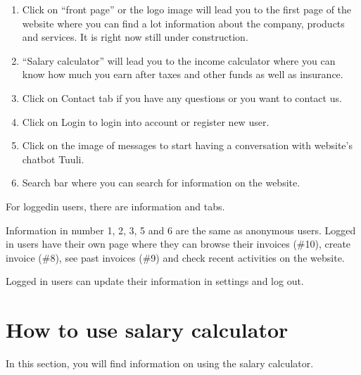 \documentclass[letterpaper,10pt,english]{sphinxmanual}
\begin{document}
\noindent{}
\begin{enumerate}
%
\item {} 
\sphinxAtStartPar
Click on “front page” or the logo image  will lead you to the first page of the website where you can find a lot information about the company, products and services. It is right now still under construction.

\item {} 
\sphinxAtStartPar
“Salary calculator” will lead you to the income calculator where you can know how much you earn after taxes and other funds as well as insurance.

\item {} 
\sphinxAtStartPar
Click on Contact tab if you have any questions or you want to contact us.

\item {} 
\sphinxAtStartPar
Click on Login to login into account or register new user.

\item {} 
\sphinxAtStartPar
Click on the image of messages to start having a conversation with website’s chatbot Tuuli.

\item {} 
\sphinxAtStartPar
Search bar where you can search for information on the website.

\end{enumerate}

\sphinxAtStartPar
For logged\sphinxhyphen{}in users, there are information and tabs.

\noindent{}

\sphinxAtStartPar
Information in number 1, 2, 3, 5 and 6 are the same as anonymous users. Logged in users have their own page where they can browse their invoices (\#10), create invoice (\#8), see past invoices (\#9) and check recent activities on the website.

\sphinxAtStartPar
Logged in users can update their information in settings and log out.

\noindent{}

\sphinxstepscope


\chapter{How to use salary calculator}
\label{\detokenize{pages/salary-calculator:how-to-use-salary-calculator}}\label{\detokenize{pages/salary-calculator::doc}}
\sphinxAtStartPar
In this section, you will find information on using the salary calculator.
\end{document}
